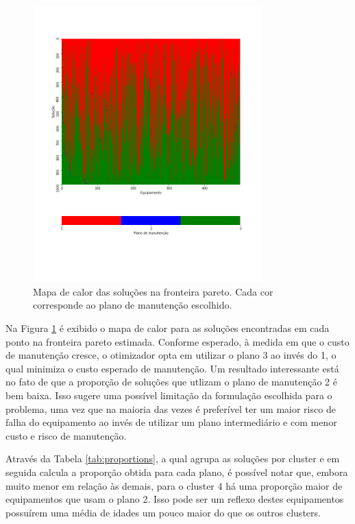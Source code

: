 \documentclass[conference]{IEEEtran}
\begin{document}
\begin{figure}[h!]
	\centering
	\includegraphics[width=3.5in]{solutions_heatmap.png}
	\caption{Mapa de calor das soluções na fronteira pareto. Cada cor corresponde ao plano de manutenção escolhido.}
	\label{fig:solutions_heatmap}
\end{figure}


Na Figura \ref{fig:solutions_heatmap} é exibido o mapa de calor para as soluções encontradas em cada ponto na fronteira pareto estimada. Conforme esperado, à medida em que o custo de manutenção cresce, o otimizador opta em utilizar o plano 3 ao invés do 1, o qual minimiza o custo esperado de manutenção. Um resultado interessante está no fato de que a proporção de soluções que utlizam o plano de manutenção 2 é bem baixa. Isso sugere uma possível limitação da formulação escolhida para o problema, uma vez que na maioria das vezes é preferível ter um maior risco de falha do equipamento ao invés de utilizar um plano intermediário e com menor custo e risco de manutenção.  

Através da Tabela \ref{tab:proportions}, a qual agrupa as soluções por cluster e em seguida calcula a proporção obtida para cada plano, é possível notar que, embora muito menor em relação às demais, para o cluster 4 há uma proporção maior de equipamentos que usam o plano 2. Isso pode ser um reflexo destes equipamentos possuírem uma média de idades um pouco maior do que os outros clusters.
\end{document}
